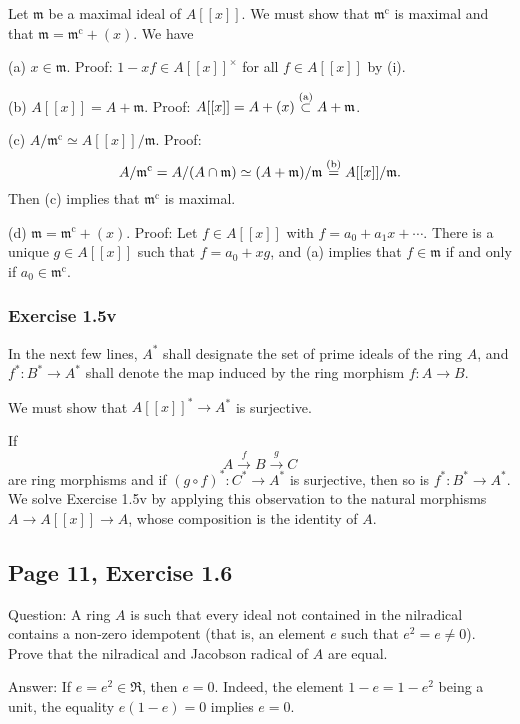 \documentclass[parskip=half,fontsize=12pt]{scrartcl}%
\newcommand{\oo}{\operatorname}\newcommand{\ooo}{\operatorname*}
\newcommand{\mf}{\mathfrak}
\newcommand{\mmm}{\mf m}
\begin{document}
Let $\mmm$ be a maximal ideal of $A[[x]]$. We must show that $\mmm^{\oo c}$ is maximal and that $\mmm=\mmm^{\oo c}+(x)$. We have 

(a) $x\in\mmm$. Proof: $1-xf\in A[[x]]^\times$ for all $f\in A[[x]]$ by (i).

(b) $A[[x]]=A+\mmm$. Proof: $A[[x]]=A+(x)\overset{(\text a)}\subset A+\mmm$.

(c) $A/\mmm^{\oo c}\simeq A[[x]]/\mmm$. Proof: 
$$
A/\mmm^{\oo c}=A/(A\cap\mmm)\simeq(A+\mmm)/\mmm\overset{(\text b)}=A[[x]]/\mmm.
$$ 
Then (c) implies that $\mmm^{\oo c}$ is maximal.

(d) $\mmm=\mmm^{\oo c}+(x)$. Proof: Let $f\in A[[x]]$ with $f=a_0+a_1x+\cdots$. There is a unique $g\in A[[x]]$ such that $f=a_0+xg$, and (a) implies that $f\in\mmm$ if and only if $a_0\in\mmm^{\oo c}$. %

\subsubsection{Exercise 1.5v}%

In the next few lines, $A^*$ shall designate the set of prime ideals of the ring $A$, and $f^*:B^*\to A^*$ shall denote the map induced by the ring morphism $f:A\to B$. 

We must show that $A[[x]]^*\to A^*$ is surjective.

If 
$$
A\xrightarrow fB\xrightarrow gC
$$ 
are ring morphisms and if $(g\circ f)^*:C^*\to A^*$ is surjective, then so is $f^*:B^*\to A^*$. We solve Exercise 1.5v by applying this observation to the natural morphisms $A\to A[[x]]\to A$, whose composition is the identity of $A$. 

\subsection{Page 11, Exercise 1.6}%

Question: A ring $A$ is such that every ideal not contained in the nilradical contains a non-zero idempotent (that is, an element $e$ such that $e^2=e\ne0$). Prove that the nilradical and Jacobson radical of $A$ are equal.

Answer: If $e=e^2\in\mf R$, then $e=0$. Indeed, the element $1-e=1-e^2$ being a unit, the equality $e(1-e)=0$ implies $e=0$.
\end{document}
